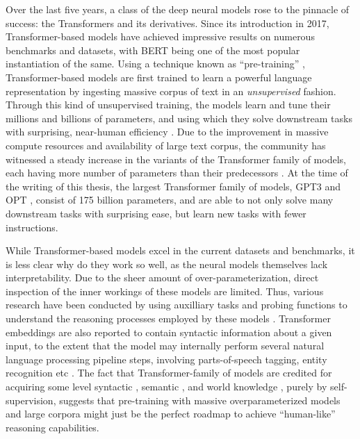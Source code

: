 \documentclass[letterpaper, 12pt]{report}
\begin{document}
Over the last five years, a class of the deep neural models rose to the pinnacle of success: the Transformers \citep{vaswani-etal-2017-attention} and its derivatives. Since its introduction in 2017, Transformer-based models have achieved impressive results on numerous benchmarks and datasets, with BERT \citep{devlin2018bert} being one of the most popular instantiation of the same. Using a technique known as ``pre-training'' \citep{mikolov2013efficient, peters-etal-2018-deep}, Transformer-based models are first trained to learn a powerful language representation by ingesting massive corpus of text in an \textit{unsupervised} fashion. Through this kind of unsupervised training, the models learn and tune their millions and billions of parameters, and using which they solve downstream tasks with surprising, near-human efficiency \citep{devlin2018bert,liu-et-al-2019-roberta,lewis-etal-2020-bart}. Due to the improvement in massive compute resources and availability of large text corpus, the community has witnessed a steady increase in the variants of the Transformer family of models, each having more number of parameters than their predecessors \citep{kaplan2020scaling}. At the time of the writing of this thesis, the largest Transformer family of models, GPT3 \citep{Brown2020:GPT3} and OPT \citep{Zhang2022:OPT}, consist of 175 billion parameters, and are able to not only solve many downstream tasks with surprising ease, but learn new tasks with fewer instructions.

While Transformer-based models excel in the current datasets and benchmarks, it is less clear why do they work so well, as the neural models themselves lack interpretability. Due to the sheer amount of over-parameterization, direct inspection of the inner workings of these models are limited. Thus, various research have been conducted by using auxilliary tasks and probing functions to understand the reasoning processes employed by these models \citep{rogers2020}. Transformer embeddings are also reported to contain syntactic information about a given input, to the extent that the model may internally perform several natural language processing pipeline steps, involving parts-of-speech tagging, entity recognition etc \citep{tenney-etal-2019-bert}. The fact that Transformer-family of models are credited for acquiring some level syntactic \citep{hewitt-manning-2019-structural,jawahar-etal-2019-bert}, semantic \citep{ettinger2020}, and world knowledge \citep{petroni-etal-2019-language, rogers2020}, purely by self-supervision, suggests that pre-training with massive overparameterized models and large corpora might just be the perfect roadmap to achieve ``human-like'' reasoning capabilities.
\end{document}

